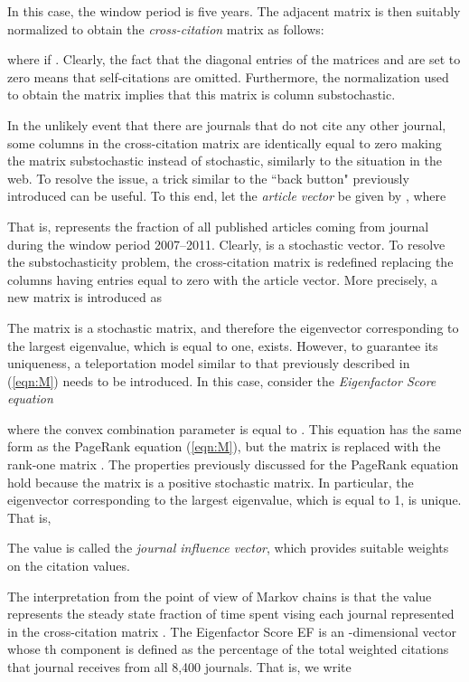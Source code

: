 \documentclass[11pt,draftcls,onecolumn]{IEEEtran}
\begin{document}
In this case, the window period is five years. The adjacent matrix  is then 
suitably normalized to obtain the {\it cross-citation} matrix  
as follows:

where  if . Clearly, the fact that the diagonal entries of the matrices 
 and  are set to zero means that self-citations are omitted. Furthermore, the normalization 
used to obtain the matrix  implies that this matrix is column substochastic.


In the unlikely event that there are journals that do not cite any other journal, 
some columns in the cross-citation matrix 
are identically 
equal to zero making the matrix substochastic instead of stochastic,
similarly to the situation in the web.
To resolve the issue, a trick similar to the ``back button" 
previously introduced can be useful.
To this end, let the {\it article vector} be given by
, where

That is,  represents the fraction of all published articles coming from journal  during 
the window period 2007--2011. Clearly,  is a stochastic vector. To resolve the substochasticity problem, 
the cross-citation matrix  is redefined replacing the columns having entries equal to zero with 
the article vector. More precisely, a new matrix  is introduced as 

The matrix  is a stochastic matrix, and therefore the 
eigenvector corresponding to the largest eigenvalue, which is equal 
to one, exists. However, to guarantee its uniqueness, 
a teleportation model similar to that 
previously described in (\ref{eqn:M}) needs to be introduced.
In this case, consider the {\it Eigenfactor Score equation}

where the convex combination parameter  is equal to . 
This equation has the same form 
as the PageRank equation (\ref{eqn:M}), but the matrix  is replaced with the rank-one matrix . 
The properties previously discussed for the PageRank equation hold because the matrix  is a positive 
stochastic matrix. In particular, the eigenvector  corresponding to the largest eigenvalue, 
which is equal to 1, is unique. That is,

The value  is called the {\it journal influence vector}, 
which provides suitable weights on the citation values. 

The interpretation from the point of view of Markov chains is that the value
 represents the steady state fraction of time spent vising each journal 
represented in the cross-citation matrix . The Eigenfactor Score EF is an -dimensional vector whose th 
component is defined as the percentage of the total weighted citations that journal  receives 
from all 8,400 journals. That is, we write
\end{document}
